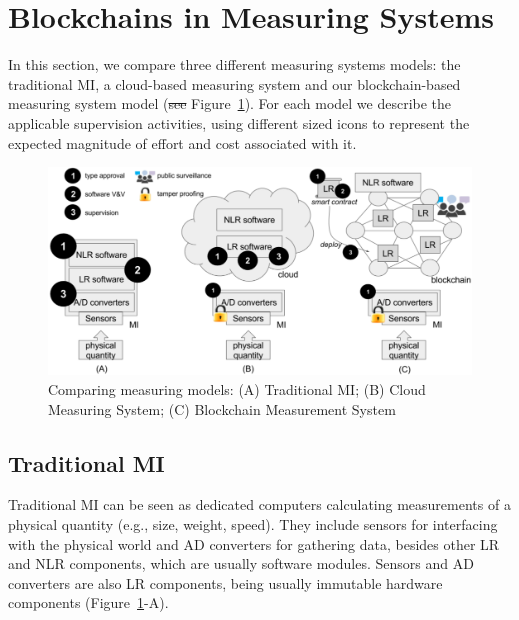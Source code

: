 \documentclass[journal]{IEEEtran}
\providecommand{\DIFdel}[1]{{\protect\color{red}\sout{#1}}}                      %
\providecommand{\DIFdelbegin}{} %
\providecommand{\DIFdelend}{} %
\begin{document}
\section{Blockchains in Measuring Systems}
In this section, we compare three different measuring systems models: the traditional MI, a cloud-based measuring system and our blockchain-based measuring system model (\DIFdelbegin \DIFdel{see }\DIFdelend Figure~\ref{f:compare}). For each model we describe the applicable supervision activities, using different sized icons to represent the expected magnitude of effort and cost associated with it.

\begin{figure}[!t]
\centering
\includegraphics[width=.69\textwidth]{measuring} %
\caption{Comparing measuring models: (A) Traditional MI; (B) Cloud Measuring System; (C) Blockchain Measurement System}
\label{f:compare}
\end{figure}

\subsection{Traditional MI}
\label{s:mi_traditional}
Traditional MI can be seen as dedicated computers calculating measurements of a physical quantity (e.g., size, weight, speed). They include sensors for interfacing with the physical world and AD converters for gathering data, besides other LR and NLR components, which are usually software modules. Sensors and AD converters are also LR components, being usually immutable hardware components (Figure~\ref{f:compare}-A).
\end{document}
